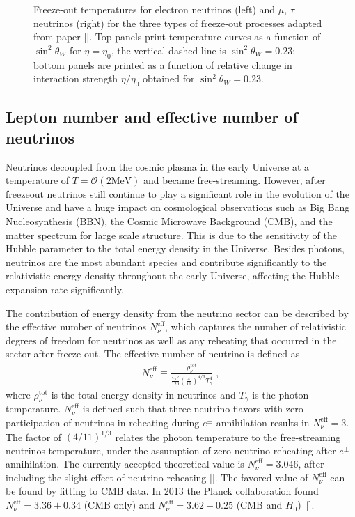 \begin{figure}[ht]
\caption{Freeze-out temperatures for electron neutrinos (left) and $\mu$, $\tau$ neutrinos (right) for the three types of freeze-out processes adapted from paper [\cite{Birrell:2014uka}]. Top panels print temperature curves as a function of $\sin^2\theta_W$ for $\eta=\eta_0$, the vertical dashed line is $\sin^2\theta_W=0.23$; bottom panels are printed as a function of relative change in interaction strength $\eta/\eta_0$ obtained for $\sin^2\theta_W=0.23$.}
\label{fig:freezeoutT}
 \end{figure}
\clearpage



\subsection{Lepton number and effective number of neutrinos}

Neutrinos decoupled from the cosmic plasma in the early Universe at a temperature of $T=\mathcal{O}(2\mathrm{MeV})$ and became free-streaming. However, after freezeout neutrinos still continue to play a significant role in the evolution of the Universe and have a huge impact on cosmological observations such as Big Bang Nucleosynthesis (BBN), the Cosmic Microwave Background (CMB), and the matter spectrum for large scale structure. This is due to the sensitivity of the Hubble parameter to the total energy density in the Universe. Besides photons, neutrinos are the most abundant species and contribute significantly to the relativistic energy density throughout the early Universe, affecting the Hubble expansion rate significantly. 

The contribution of energy density from the neutrino sector can be described by the effective number of neutrinos $N_{\nu}^{\mathrm{eff}}$, which captures the number of relativistic degrees of freedom for neutrinos as well as any reheating that occurred in the sector after freeze-out. The effective number of neutrino is defined as 
\begin{align}\label{Neff}
N_\nu^{\mathrm{eff}}\equiv\frac{\rho^{\mathrm{tot}}_\nu}{\frac{7\pi^2}{120}\left(\frac{4}{11}\right)^{4/3}T_\gamma^4}\;,
\end{align}
where $\rho_\nu^{\mathrm{tot}}$ is the total energy density in neutrinos and $T_\gamma$ is the photon temperature. $N_\nu^{\mathrm{eff}}$ is defined such that three neutrino flavors with zero participation of neutrinos in reheating during $e^\pm$ annihilation results in $N_\nu^{\mathrm{eff}}=3$. The factor of $\left(4/11\right)^{1/3}$ relates the photon temperature to the free-streaming neutrinos temperature, under the assumption of zero neutrino reheating after $e^\pm$ annihilation. The currently accepted theoretical value is $N_\nu^{\mathrm{eff}}=3.046$, after including the slight effect of neutrino reheating [\cite{Mangano:2005cc,Birrell:2014uka}]. The favored value of $N_\nu^{\mathrm{eff}}$ can be found by fitting to CMB data. In 2013 the Planck collaboration found $N_\nu^{\mathrm{eff}}=3.36\pm0.34$ (CMB only) and $N_\nu^{\mathrm{eff}}= 3.62\pm0.25$ (CMB and $H_0$)~[\cite{Planck:2013pxb}].

